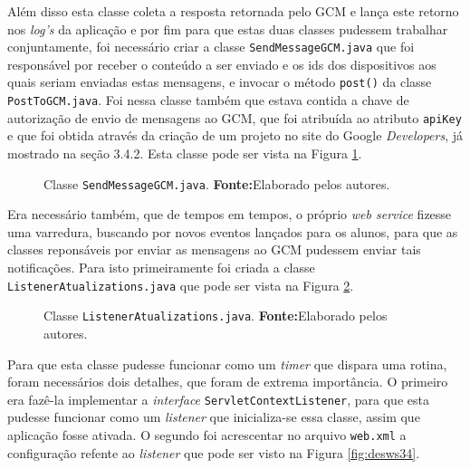 	\pagebreak
	
	\par Além disso esta classe coleta a resposta retornada pelo GCM e lança este
retorno nos \textit{log's} da aplicação e por fim para que estas duas classes
pudessem trabalhar conjuntamente, foi necessário criar a classe
\texttt{SendMessageGCM.java} que foi responsável por receber o conteúdo a ser
enviado e os ids dos dispositivos aos quais seriam enviadas estas mensagens, e
invocar o método \texttt{post()} da classe \texttt{PostToGCM.java}. Foi nessa
classe também que estava contida a chave de autorização de envio de mensagens
ao GCM, que foi atribuída ao atributo \texttt{apiKey} e que foi obtida através
da criação de um projeto no site do Google \textit{Developers}, já mostrado na
seção 3.4.2.
Esta classe pode ser vista na Figura \ref{fig:desws32}.

	\begin{figure}[h!]
		
		\caption[Classe SendMessageGCM.java]{Classe \texttt{SendMessageGCM.java}.
		\textbf{Fonte:}Elaborado pelos autores.}
		\label{fig:desws32}
	\end{figure}
	
	\pagebreak		
	
	\par Era necessário também, que  de tempos em tempos, o próprio \textit{web
service} fizesse uma varredura, buscando por novos eventos lançados para os
alunos, para que as classes reponsáveis por enviar as mensagens ao GCM pudessem
enviar tais notificações. Para isto primeiramente foi criada a classe
\texttt{ListenerAtualizations.java} que pode ser vista na Figura
\ref{fig:desws33}.

	\begin{figure}[h!]
		
		\caption[Classe ListenerAtualizations.java]{Classe
		\texttt{ListenerAtualizations.java}.
		\textbf{Fonte:}Elaborado pelos autores.}
		\label{fig:desws33}
	\end{figure}
	
	\par Para que esta classe pudesse funcionar como um \textit{timer} que
dispara uma rotina, foram necessários dois detalhes, que foram de extrema
importância. O primeiro era fazê-la implementar a \textit{interface}
\texttt{ServletContextListener}, para que esta pudesse funcionar como um
\textit{listener} que inicializa-se essa classe, assim que aplicação fosse
ativada. O segundo foi acrescentar no arquivo \texttt{web.xml} a configuração
refente ao \textit{listener} que pode ser visto na Figura \ref{fig:desws34}.

